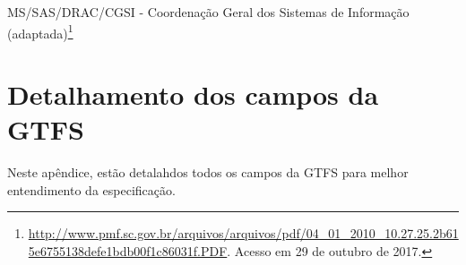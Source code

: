 \documentclass[
	12pt,				%
	oneside,			%
	a4paper,			%
	english,			%
	brazil				%
	]{abntex2ppgsi}
\begin{document}
{{{\begin{apendicesenv}
\begin{longtable}{c|c}
\end{longtable}

 MS/SAS/DRAC/CGSI - Coordenação Geral dos Sistemas de Informação (adaptada)\footnote{\url{http://www.pmf.sc.gov.br/arquivos/arquivos/pdf/04_01_2010_10.27.25.2b615e6755138defe1bdb00f1c86031f.PDF}. Acesso em 29 de outubro de 2017.}

\clearpage


%
%
%
\chapter{Detalhamento dos campos da GTFS}
\label{apendiceC}

Neste apêndice, estão detalahdos todos os campos da GTFS para melhor entendimento da especificação.



\end{apendicesenv}}}}
\end{document}
